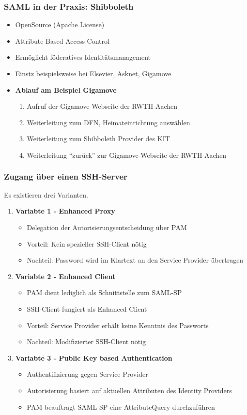 \subsubsection{SAML in der Praxis: Shibboleth}
\begin{itemize}
	\item OpenSource (Apache License)
	\item Attribute Based Access Control
	\item Ermöglicht föderatives Identitätsmanagement
	\item Einstz beispielsweise bei Elsevier, Asknet, Gigamove
	\item \textbf{Ablauf am Beispiel Gigamove}
	\begin{enumerate}
		\item Aufruf der Gigamove Webseite der RWTH Aachen
		\item Weiterleitung zum DFN, Heimateinrichtung auswählen
		\item Weiterleitung zum Shibboleth Provider des KIT
		\item Weiterleitung "`zurück"' zur Gigamove-Webseite der RWTH Aachen
	\end{enumerate}
\end{itemize}

\subsubsection{Zugang über einen SSH-Server}
Es existieren drei Varianten.
\begin{enumerate}
	\item \textbf{Variabte 1 - Enhanced Proxy}
	\begin{itemize}
		\item Delegation der Autorisierungsentscheidung über PAM
		\item Vorteil: Kein spezieller SSH-Client nötig
		\item Nachteil: Password wird im Klartext an den Service Provider übertragen
	\end{itemize}
	\item \textbf{Variabte 2 - Enhanced Client}
	\begin{itemize}
		\item PAM dient lediglich als Schnittstelle zum SAML-SP
		\item SSH-Client fungiert als Enhanced Client
		\item Vorteil: Service Provider erhält keine Kenntnis des Passworts
		\item Nachteil: Modifizierter SSH-Client nötig
	\end{itemize}
	\item \textbf{Variabte 3 - Public Key based Authentication}
	\begin{itemize}
		\item Authentifizierung gegen Service Provider
		\item Autorisierung basiert auf aktuellen Attributen des Identity Providers
		\item PAM beauftragt SAML-SP eine AttributeQuery durchzuführen
	\end{itemize}
\end{enumerate}

